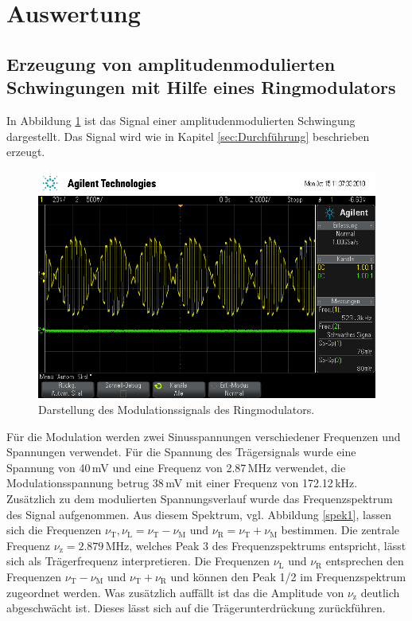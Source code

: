 \section{Auswertung}
\label{sec:Auswertung}

\subsection{Erzeugung von amplitudenmodulierten Schwingungen mit Hilfe eines
Ringmodulators}
In Abbildung \ref{fig:plot} ist das Signal einer amplitudenmodulierten
Schwingung dargestellt. Das Signal wird wie in Kapitel \ref{sec:Durchführung}
beschrieben erzeugt.

\begin{figure}
  \centering
  \includegraphics[width=0.7\linewidth]{ressources/scope_451.png}
  \caption{Darstellung des Modulationssignals des Ringmodulators.}
  \label{fig:plot}
\end{figure}
Für die Modulation werden zwei Sinusspannungen verschiedener Frequenzen und
Spannungen verwendet.
Für die Spannung des Trägersignals wurde eine Spannung von 40$\,$mV und eine
Frequenz von 2.87$\,$MHz
verwendet, die Modulationsspannung betrug 38$\,$mV mit einer Frequenz von
172.12$\,$kHz. Zusätzlich zu
dem modulierten Spannungsverlauf wurde das Frequenzspektrum des
Signal aufgenommen. Aus diesem Spektrum, vgl. Abbildung \ref{spek1}, lassen sich
die Frequenzen $\nu_\text{T},\nu_\text{L}=\nu_\text{T}-\nu_\text{M}$ und
$\nu_\text{R}=\nu_\text{T}+\nu_\text{M}$ bestimmen.
Die zentrale Frequenz $\nu_\text{z}=2.879\,$MHz, welches Peak 3 des
Frequenzspektrums entspricht, lässt sich als Trägerfrequenz interpretieren.
Die Frequenzen $\nu_\text{L}$ und $\nu_\text{R}$ entsprechen den Frequenzen
$\nu_\text{T}-\nu_\text{M}$ und $\nu_\text{T}+\nu_\text{R}$ und können den
Peak 1/2 im Frequenzspektrum zugeordnet werden. Was zusätzlich auffällt ist das
die Amplitude von $\nu_\text{z}$ deutlich abgeschwächt ist. Dieses lässt sich
auf die Trägerunterdrückung zurückführen.

